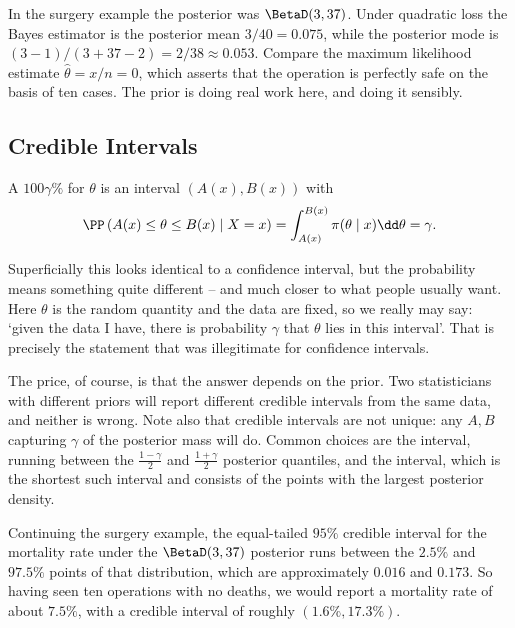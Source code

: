 \begin{example}
  In the surgery example the posterior was $\BetaD(3,37)$. Under quadratic loss the Bayes estimator is the posterior mean $3/40 = 0.075$, while the posterior mode is $(3-1)/(3+37-2) = 2/38 \approx 0.053$. Compare the maximum likelihood estimate $\hat\theta = x/n = 0$, which asserts that the operation is perfectly safe on the basis of ten cases. The prior is doing real work here, and doing it sensibly.
\end{example}

\subsection{Credible Intervals}

\begin{definition}
  A $100\gamma\%$  for $\theta$ is an interval $(A(x), B(x))$ with
  $$
  \PP\left(A(x) \leq \theta \leq B(x) \mid X = x\right) = \int_{A(x)}^{B(x)}\pi(\theta\mid x)\dd\theta = \gamma.
  $$
\end{definition}

Superficially this looks identical to a confidence interval, but the probability means something quite different -- and much closer to what people usually want. Here $\theta$ is the random quantity and the data are fixed, so we really may say: `given the data I have, there is probability $\gamma$ that $\theta$ lies in this interval'. That is precisely the statement that was illegitimate for confidence intervals.

The price, of course, is that the answer depends on the prior. Two statisticians with different priors will report different credible intervals from the same data, and neither is wrong. Note also that credible intervals are not unique: any $A, B$ capturing $\gamma$ of the posterior mass will do. Common choices are the  interval, running between the $\frac{1-\gamma}{2}$ and $\frac{1+\gamma}{2}$ posterior quantiles, and the  interval, which is the shortest such interval and consists of the points with the largest posterior density.

\begin{example}
  Continuing the surgery example, the equal-tailed $95\%$ credible interval for the mortality rate under the $\BetaD(3,37)$ posterior runs between the $2.5\%$ and $97.5\%$ points of that distribution, which are approximately $0.016$ and $0.173$. So having seen ten operations with no deaths, we would report a mortality rate of about $7.5\%$, with a credible interval of roughly $(1.6\%, 17.3\%)$.
\end{example}



